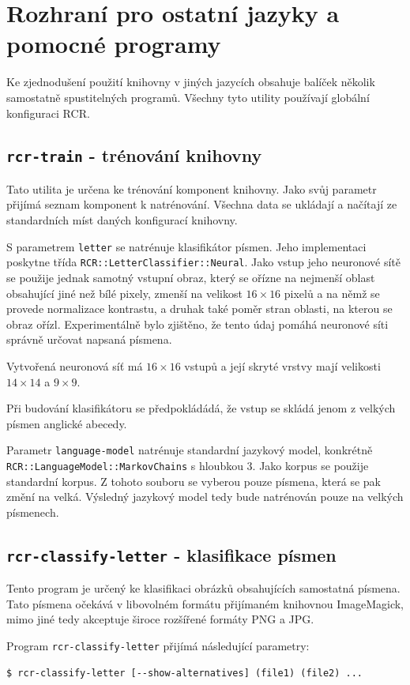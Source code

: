 \documentclass[a4paper]{article}
\begin{document}
\section{Rozhraní pro ostatní jazyky a pomocné programy}
Ke zjednodušení použití knihovny v jiných jazycích obsahuje balíček několik
samostatně spustitelných programů. Všechny tyto utility používají globální
konfiguraci RCR.

\subsection{\texttt{rcr-train} - trénování knihovny}
Tato utilita je určena ke trénování komponent knihovny.
Jako svůj parametr přijímá seznam komponent k natrénování.
Všechna data se ukládají a načítají ze standardních míst daných konfigurací
knihovny.

S parametrem \texttt{letter} se natrénuje klasifikátor
písmen. Jeho implementaci poskytne třída \texttt{RCR::LetterClassifier::Neural}. Jako
vstup jeho neuronové sítě se použije jednak samotný vstupní obraz,
který se ořízne na nejmenší oblast obsahující jiné než bílé pixely,
zmenší na velikost $16\times 16$ pixelů a na němž se provede normalizace
kontrastu, a druhak také poměr stran oblasti, na kterou se obraz ořízl.
Experimentálně bylo zjištěno, že tento údaj pomáhá neuronové síti správně
určovat napsaná písmena.

Vytvořená neuronová síť má $16\times 16$ vstupů a její skryté vrstvy mají
velikosti $14\times 14$ a $9\times 9$.

Při budování klasifikátoru se předpokládádá, že vstup se skládá jenom
z velkých písmen anglické abecedy.

Parametr \texttt{language-model} natrénuje standardní jazykový model, konkrétně
\texttt{RCR::LanguageModel::MarkovChains} s hloubkou 3. Jako korpus se použije
standardní korpus. Z tohoto souboru se vyberou pouze písmena, která se pak změní
na velká. Výsledný jazykový model tedy bude natrénován pouze na velkých
písmenech.

\subsection{\texttt{rcr-classify-letter} - klasifikace písmen}
Tento program je určený ke klasifikaci obrázků obsahujících samostatná písmena.
Tato písmena očekává v libovolném formátu přijímaném knihovnou ImageMagick,
mimo jiné tedy akceptuje široce rozšířené formáty PNG a JPG.

Program \texttt{rcr-classify-letter} přijímá následující parametry:
\begin{lstlisting}
$ rcr-classify-letter [--show-alternatives] (file1) (file2) ...
\end{lstlisting}
\end{document}
